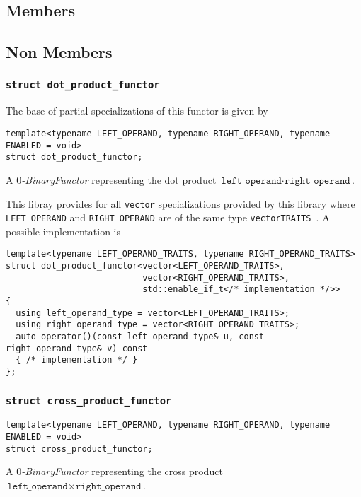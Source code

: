 \documentclass[oneside]{book}
\begin{document}
\subsection{Members}

\subsection{Non Members}
\subsubsection{\texttt{struct dot\_product\_functor}}
The base of partial specializations of this functor is given by
\begin{verbatim}
template<typename LEFT_OPERAND, typename RIGHT_OPERAND, typename ENABLED = void>
struct dot_product_functor;
\end{verbatim}
A \textit{$0$-BinaryFunctor} representing the dot product $\texttt{left\_operand} \cdot \texttt{right\_operand}$.\newline

\noindent{}This libray provides for all \texttt{vector} specializations provided by this library
where \texttt{LEFT\_OPERAND} and \texttt{RIGHT\_OPERAND} are of the same type \texttt{vector\textlangle TRAITS \textrangle}.
A possible implementation is
\begin{verbatim}
template<typename LEFT_OPERAND_TRAITS, typename RIGHT_OPERAND_TRAITS>
struct dot_product_functor<vector<LEFT_OPERAND_TRAITS>,
                           vector<RIGHT_OPERAND_TRAITS>,
                           std::enable_if_t</* implementation */>>
{
  using left_operand_type = vector<LEFT_OPERAND_TRAITS>;
  using right_operand_type = vector<RIGHT_OPERAND_TRAITS>;
  auto operator()(const left_operand_type& u, const right_operand_type& v) const
  { /* implementation */ }
};
\end{verbatim}


\subsubsection{\texttt{struct cross\_product\_functor}}
\begin{verbatim}
template<typename LEFT_OPERAND, typename RIGHT_OPERAND, typename ENABLED = void>
struct cross_product_functor;
\end{verbatim}
A \textit{$0$-BinaryFunctor} representing the cross product $\texttt{left\_operand} \times \texttt{right\_operand}$.\newline
\end{document}

